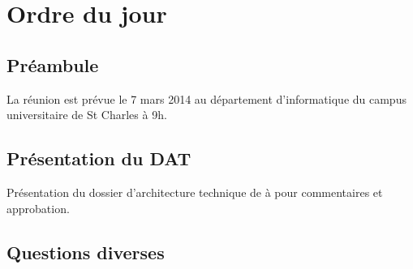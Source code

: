 \documentclass[11pt,fleqn]{report}
\begin{document}
\ZMakeCover


\chapter{Ordre du jour}

\section{Préambule}
La réunion est prévue le 7 mars 2014 au département d'informatique du campus universitaire de St Charles à 9h.

\section{Présentation du DAT}
Présentation du dossier d'architecture technique de \amo à \mo pour commentaires et approbation.

\section{Questions diverses}
\end{document}
